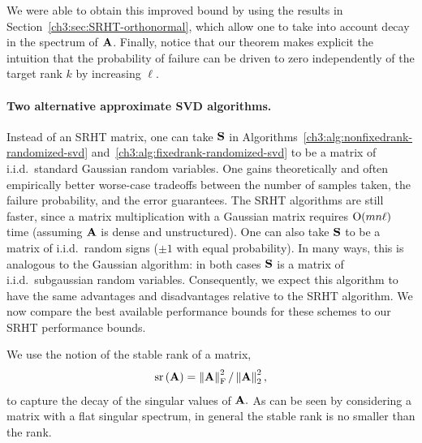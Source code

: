 We were able to obtain this improved bound
by using the results in Section~\ref{ch3:sec:SRHT-orthonormal}, which allow one 
to take into account decay in the spectrum of $\mathbf{A}$.
Finally, notice that our theorem makes explicit the intuition that the 
probability of failure can be driven to zero independently of the target 
rank $k$ by increasing $\ell.$

\paragraph{Two alternative approximate SVD algorithms.}
Instead of an SRHT matrix, one can take $\mathbf{S}$ in 
Algorithms~\ref{ch3:alg:nonfixedrank-randomized-svd} and~\ref{ch3:alg:fixedrank-randomized-svd}
to be a matrix of i.i.d.\ standard Gaussian random variables. One gains theoretically and 
often empirically better worse-case tradeoffs between the number of samples 
taken, the failure probability, and the error guarantees. The SRHT algorithms are 
still faster, since a matrix multiplication with a Gaussian matrix requires 
$\mathrm{O}(mn\ell)$ time (assuming $\mathbf{A}$ is dense and unstructured). 
One can also take $\mathbf{S}$ to be a matrix of 
i.i.d.\ random signs ($\pm 1$ with equal probability). In many ways, this is 
analogous to the Gaussian algorithm: in both cases $\mathbf{S}$ is a matrix of 
i.i.d.\ subgaussian random variables. Consequently, we expect this algorithm to have 
the same advantages and disadvantages relative to the SRHT algorithm. We now 
compare the best available performance bounds for these schemes to our SRHT 
performance bounds.

We use the notion of the stable rank of a matrix,
$$
 \operatorname{sr}\left(\mathbf{A}\right) = \left\|\mathbf{A}\right\|_\mathrm{F}^2/\left\|\mathbf{A}\right\|_2^2,
$$
to capture the decay of the singular values of $\mathbf{A}.$
As can be seen by considering a matrix with a flat singular spectrum, in 
general the stable rank is no smaller than the rank.


